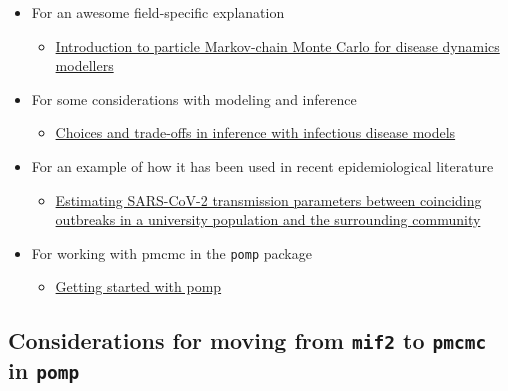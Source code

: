 \documentclass[
  letterpaper,
  DIV=11,
  numbers=noendperiod]{scrartcl}
\providecommand{\tightlist}{%
  \setlength{\itemsep}{0pt}\setlength{\parskip}{0pt}}\usepackage{longtable,booktabs,array}
\begin{document}
\begin{itemize}
\tightlist
\item
  For an awesome field-specific explanation

  \begin{itemize}
  \tightlist
  \item
    \href{https://doi.org/10.1016/j.epidem.2019.100363}{Introduction to
    particle Markov-chain Monte Carlo for disease dynamics modellers}
  \end{itemize}
\item
  For some considerations with modeling and inference

  \begin{itemize}
  \tightlist
  \item
    \href{https://www.sciencedirect.com/science/article/pii/S1755436519300441}{Choices
    and trade-offs in inference with infectious disease models}
  \end{itemize}
\item
  For an example of how it has been used in recent epidemiological
  literature

  \begin{itemize}
  \tightlist
  \item
    \href{https://www.medrxiv.org/content/10.1101/2024.01.10.24301116v1}{Estimating
    SARS-CoV-2 transmission parameters between coinciding outbreaks in a
    university population and the surrounding community}
  \end{itemize}
\item
  For working with pmcmc in the \texttt{pomp} package

  \begin{itemize}
  \tightlist
  \item
    \href{https://kingaa.github.io/pomp/vignettes/getting_started.html\#Sampling_the_posterior_using_particle_Markov_chain_Monte_Carlo}{Getting
    started with pomp}
  \end{itemize}
\end{itemize}

\hypertarget{considerations-for-moving-from-mif2-to-pmcmc-in-pomp}{%
\subsection{\texorpdfstring{Considerations for moving from \texttt{mif2}
to \texttt{pmcmc} in
\texttt{pomp}}{Considerations for moving from mif2 to pmcmc in pomp}}\label{considerations-for-moving-from-mif2-to-pmcmc-in-pomp}}
\end{document}
